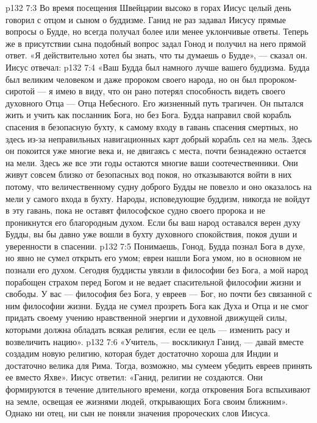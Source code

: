 \vs p132 7:3 \pc Во время посещения Швейцарии высоко в горах Иисус целый день говорил с отцом и сыном о буддизме. Ганид не раз задавал Иисусу прямые вопросы о Будде, но всегда получал более или менее уклончивые ответы. Теперь же в присутствии сына подобный вопрос задал Гонод и получил на него прямой ответ. «Я действительно хотел бы знать, что ты думаешь о Будде», --- сказал он. Иисус отвечал:
\vs p132 7:4 «Ваш Будда был намного лучше вашего буддизма. Будда был великим человеком и даже пророком своего народа, но он был пророком\hyp{}сиротой --- я имею в виду, что он рано потерял способность видеть своего духовного Отца --- Отца Небесного. Его жизненный путь трагичен. Он пытался жить и учить как посланник Бога, но без Бога. Будда направил свой корабль спасения в безопасную бухту, к самому входу в гавань спасения смертных, но здесь из\hyp{}за неправильных навигационных карт добрый корабль сел на мель. Здесь он покоится уже многие века и, не двигаясь с места, почти безнадежно остается на мели. Здесь же все эти годы остаются многие ваши соотечественники. Они живут совсем близко от безопасных вод покоя, но отказываются войти в них потому, что величественному судну доброго Будды не повезло и оно оказалось на мели у самого входа в бухту. Народы, исповедующие буддизм, никогда не войдут в эту гавань, пока не оставят философское судно своего пророка и не проникнутся его благородным духом. Если бы ваш народ оставался верен духу Будды, вы бы давно уже вошли в бухту духовного спокойствия, покоя души и уверенности в спасении.
\vs p132 7:5 Понимаешь, Гонод, Будда познал Бога в духе, но явно не сумел открыть его умом; евреи нашли Бога умом, но в основном не познали его духом. Сегодня буддисты увязли в философии без Бога, а мой народ порабощен страхом перед Богом и не ведает спасительной философии жизни и свободы. У вас --- философия без Бога, у евреев --- Бог, но почти без связанной с ним философии жизни. Будда не сумел прозреть Бога как Духа и Отца и не смог придать своему учению нравственной энергии и духовной движущей силы, которыми должна обладать всякая религия, если ее цель --- изменить расу и возвеличить нацию».
\vs p132 7:6 «Учитель, --- воскликнул Ганид, --- давай вместе создадим новую религию, которая будет достаточно хороша для Индии и достаточно велика для Рима. Тогда, возможно, мы сумеем убедить евреев принять ее вместо Яхве». Иисус ответил: «Ганид, религии не создаются. Они формируются в течение длительного времени, когда откровения Бога вспыхивают на земле, освещая ее жизнями людей, открывающих Бога своим ближним». Однако ни отец, ни сын не поняли значения пророческих слов Иисуса.
